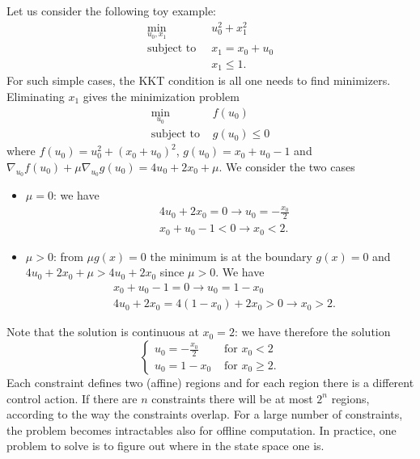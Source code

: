 \documentclass[11pt]{report}
\begin{document}
Let us consider the following toy example:
\begin{align*}
  \min_{u_0,x_1} &\ u_0^2+x_1^2 \\
  \text{subject to } &\ x_1 = x_0+u_0 \\
                 &\ x_1\le 1.
\end{align*}
For such simple cases, the KKT condition is all one needs to find minimizers. Eliminating $x_1$ gives the minimization problem
\begin{align*}
  \min_{u_0}\  & f(u_0) \\
  \text{subject to } & g(u_0) \le 0
\end{align*}
where $f(u_0) = u_0^2 + (x_0+u_0)^2$, $g(u_0) = x_0 + u_0 - 1$ and $\nabla_{u_0} f(u_0) + \mu \nabla_{u_0} g(u_0) = 4u_0 + 2x_0 + \mu$. We consider the two cases
\begin{itemize}
\item $\mu = 0$: we have
  \begin{align*}
    & 4u_0 + 2x_0 = 0 \rightarrow u_0 = -\frac{x_0}{2} \\
    & x_0 + u_0 - 1 < 0 \rightarrow x_0 < 2.
  \end{align*}
\item $\mu > 0$: from $\mu g(x) = 0$ the minimum is at the boundary $g(x)=0$ and $4u_0+2x_0+\mu > 4u_0+2x_0$ since $\mu>0$. We have
  \begin{align*}
    &x_0 + u_0 - 1 = 0 \rightarrow u_0 = 1-x_0 \\
    &4u_0 + 2x_0 = 4(1-x_0) + 2x_0 > 0 \rightarrow x_0 > 2.
  \end{align*}
\end{itemize}
Note that the solution is continuous at $x_0=2$: we have therefore the solution
\begin{equation*}
  \begin{cases}
    u_0 = -\frac{x_0}{2} & \text{ for } x_0 < 2 \\
    u_0 = 1-x_0 & \text{ for } x_0 \ge 2.
  \end{cases}
\end{equation*}
Each constraint defines two (affine) regions and for each region there is a different control action. If there are $n$ constraints there will be at most $2^n$ regions, according to the way the constraints overlap. For a large number of constraints, the problem becomes intractables also for offline computation. In practice, one problem to solve is to figure out where in the state space one is.

\end{document}
